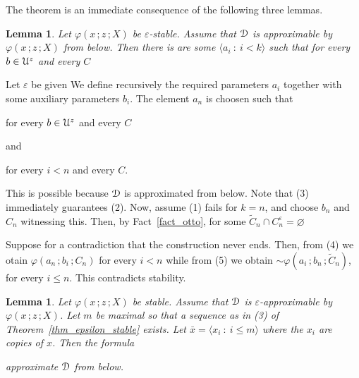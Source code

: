 \documentclass{amsproc}
\makeatletter
\newcounter{thm}
\theoremstyle{mio}
\newtheorem{lemma}[thm]{Lemma}\tcolorboxenvironment{lemma}{mythm}
\providecommand{\proofNameStyle}{\bfseries}
\renewenvironment{proof}[1][\proofname]{\par
  \pushQED{\qed}%
  \normalfont%
  \trivlist
  \item[\hskip\labelsep
        \proofNameStyle
    #1\@addpunct{.}]\ignorespaces
}{%
  \popQED\endtrivlist\@endpefalse
}
\makeatother
\begin{document}
\begin{proof}
  The theorem is an immediate consequence of the following three lemmas.
\end{proof}

\begin{lemma}
  Let $\varphi(x\,;z\,;X)$ be $\varepsilon$-stable.
  Assume that ${\EuScript D}$ is approximable by $\varphi(x\,;z\,;X)$ from below.
  Then there is are some $\langle a_i\ :\ i<k\rangle$ such that for every $b\in{\EuScript U}^z$ and every $C$\medskip

  \medskip 

\end{lemma}

\begin{proof}
Let $\varepsilon$ be given
  We define recursively the required parameters $a_i$ together with some auxiliary parameters $b_i$.
The element $a_n$ is choosen such that

\hfill for every $b\in{\EuScript U}^z$ and every $C$

and

\hfill for every $i<n$ and every $C$.\smallskip

This is possible because ${\EuScript D}$ is approximated from below.
Note that (3) immediately guarantees (2).
Now, assume (1) fails for $k=n$, and choose $b_n$ and $C_n$ witnessing this.
Then, by Fact~\ref{fact_otto}, for some $\tilde C_n\cap C_n^\varepsilon=\varnothing$


Suppose for a contradiction that the construction never ends.
Then, from (4) we otain $\varphi(a_n\,;b_i\,;C_n)$ for every $i<n$ while from (5) we obtain ${\sim}\varphi(a_i\,;b_n\,;\tilde C_n)$, for every $i\le n$.
This contradicts stability.
\end{proof}

\begin{lemma}
  Let $\varphi(x\,;z\,;X)$ be stable.
  Assume that ${\EuScript D}$ is $\varepsilon$-approximable by $\varphi(x\,;z\,;X)$.
  Let $m$ be maximal so that a sequence as in (3) of Theorem~\ref{thm_epsilon_stable} exists.
  Let $\bar x=\langle x_i\ :\ i\le m\rangle$ where the $x_i$ are copies of $x$.
  Then the formula\smallskip

  \smallskip

  approximate ${\EuScript D}$ from below.
\end{lemma}
\end{document}
